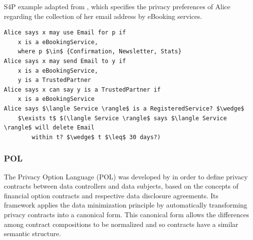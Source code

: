 \begin{listing}
\caption{S4P example adapted from \cite{becker_framework_2009}, which specifies the privacy preferences of Alice regarding the collection of her email address by eBooking services.}
\label{list:s4p_example}
\begin{verbatim}
Alice says x may use Email for p if
    x is a eBookingService,
    where p $\in$ {Confirmation, Newsletter, Stats}
Alice says x may send Email to y if
    x is a eBookingService,
    y is a TrustedPartner
Alice says x can say y is a TrustedPartner if
    x is a eBookingService
Alice says $\langle Service \rangle$ is a RegisteredService? $\wedge$
    $\exists t$ $(\langle Service \rangle$ says $\langle Service \rangle$ will delete Email 
        within t? $\wedge$ t $\leq$ 30 days?)
\end{verbatim}
\end{listing}

\subsubsection{POL}
\label{sec:pol}

The Privacy Option Language (POL) was developed by \cite{berthold_privacy_2013} in order to define privacy contracts between data controllers and data subjects, based on the concepts of financial option contracts and respective data disclosure agreements.
Its framework applies the data minimization principle by automatically transforming privacy contracts into a canonical form.
This canonical form allows the differences among contract compositions to be normalized and so contracts have a similar semantic structure.

